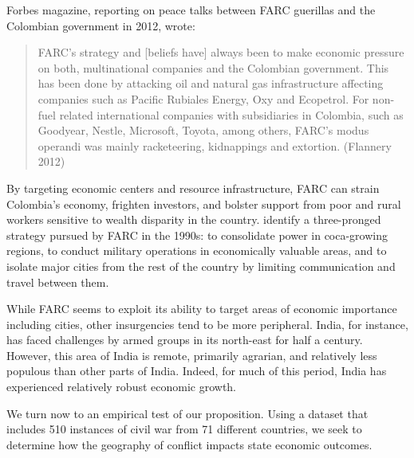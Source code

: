 Forbes magazine, reporting on peace talks between FARC guerillas and the Colombian government in 2012, wrote: 
\begin{quote}FARC's strategy and [beliefs have] always been to make economic pressure on both, multinational companies and the Colombian government. This has been done by attacking oil and natural gas infrastructure affecting companies such as Pacific Rubiales Energy, Oxy and Ecopetrol. For non-fuel related international companies with subsidiaries in Colombia, such as Goodyear, Nestle, Microsoft, Toyota, among others, FARC’s modus operandi was mainly racketeering, kidnappings and extortion. (Flannery 2012)\end{quote}
By targeting economic centers and resource infrastructure, FARC can strain Colombia's economy, frighten investors, and bolster support from poor and rural workers sensitive to wealth disparity in the country.  \cite{rabasa:chalk:2001} identify a three-pronged strategy pursued by FARC in the 1990s: to consolidate power in coca-growing regions, to conduct military operations in economically valuable areas, and to isolate major cities from the rest of the country by limiting communication and travel between them.    

While FARC seems to exploit its ability to target areas of economic importance including cities, other insurgencies tend to be more peripheral.  India, for instance, has faced challenges by armed groups in its north-east for half a century.  However, this area of India is remote, primarily agrarian, and relatively less populous than other parts of India.  Indeed, for much of this period, India has experienced relatively robust economic growth.

We turn now to an empirical test of our proposition.  Using a dataset that includes 510 instances of civil war from 71 different countries, we seek to determine how the geography of conflict impacts state economic outcomes.


%
